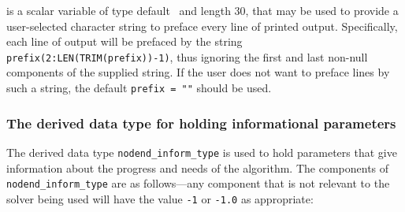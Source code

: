 \documentclass{galahad}
\newcommand{\packagename}{nodend}
\begin{document}
\begin{description}
 is a scalar variable of type default \character\
and length 30, that may be used to provide a user-selected
character string to preface every line of printed output.
Specifically, each line of output will be prefaced by the string
{\tt prefix(2:LEN(TRIM(prefix))-1)},
thus ignoring the first and last non-null components of the
supplied string. If the user does not want to preface lines by such
a string, the default {\tt prefix = ""} should be used.

\end{description}


\subsubsection{The derived data type for holding informational
 parameters}\label{typeinform}
The derived data type
{\tt \packagename\_inform\_type}
is used to hold parameters that give information about the progress and needs
of the algorithm. The components of
{\tt \packagename\_inform\_type}
are as follows---any component that is not relevant to the solver being used
will have the value {\tt -1} or {\tt -1.0} as appropriate:
\end{document}
